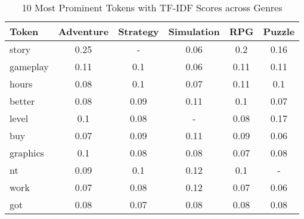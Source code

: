 \begin{table}[h]
    \centering
    \begin{tabular}{l|c|c|c|c|c}
        Token & Adventure & Strategy & Simulation & RPG & Puzzle \\
        \hline
        story & 0.25 & - & 0.06 & 0.2 & 0.16 \\
        gameplay & 0.11 & 0.1 & 0.06 & 0.11 & 0.11 \\
        hours & 0.08 & 0.1 & 0.07 & 0.11 & 0.1 \\
        better & 0.08 & 0.09 & 0.11 & 0.1 & 0.07 \\
        level & 0.1 & 0.08 & - & 0.08 & 0.17 \\
        buy & 0.07 & 0.09 & 0.11 & 0.09 & 0.06 \\
        graphics & 0.1 & 0.08 & 0.08 & 0.07 & 0.08 \\
        nt & 0.09 & 0.1 & 0.12 & 0.1 & - \\
        work & 0.07 & 0.08 & 0.12 & 0.07 & 0.06 \\
        got & 0.08 & 0.07 & 0.08 & 0.08 & 0.08
    \end{tabular}
    \caption{10 Most Prominent Tokens with TF-IDF Scores across Genres}
    \label{tab:top_tokens_by_genre}
\end{table}